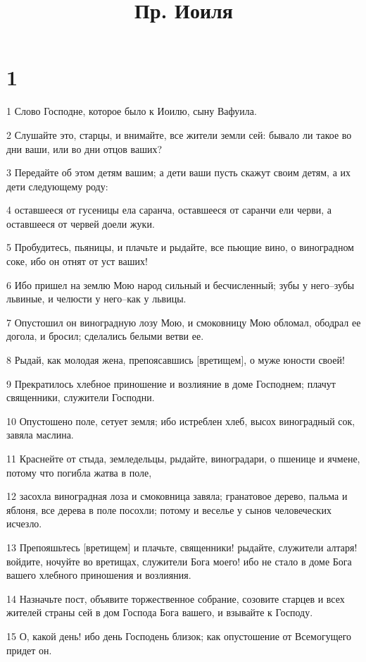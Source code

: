

\title{Пр. Иоиля}


\chapter{1}

\par 1 Слово Господне, которое было к Иоилю, сыну Вафуила.
\par 2 Слушайте это, старцы, и внимайте, все жители земли сей: бывало ли такое во дни ваши, или во дни отцов ваших?
\par 3 Передайте об этом детям вашим; а дети ваши пусть скажут своим детям, а их дети следующему роду:
\par 4 оставшееся от гусеницы ела саранча, оставшееся от саранчи ели черви, а оставшееся от червей доели жуки.
\par 5 Пробудитесь, пьяницы, и плачьте и рыдайте, все пьющие вино, о виноградном соке, ибо он отнят от уст ваших!
\par 6 Ибо пришел на землю Мою народ сильный и бесчисленный; зубы у него--зубы львиные, и челюсти у него--как у львицы.
\par 7 Опустошил он виноградную лозу Мою, и смоковницу Мою обломал, ободрал ее догола, и бросил; сделались белыми ветви ее.
\par 8 Рыдай, как молодая жена, препоясавшись [вретищем], о муже юности своей!
\par 9 Прекратилось хлебное приношение и возлияние в доме Господнем; плачут священники, служители Господни.
\par 10 Опустошено поле, сетует земля; ибо истреблен хлеб, высох виноградный сок, завяла маслина.
\par 11 Краснейте от стыда, земледельцы, рыдайте, виноградари, о пшенице и ячмене, потому что погибла жатва в поле,
\par 12 засохла виноградная лоза и смоковница завяла; гранатовое дерево, пальма и яблоня, все дерева в поле посохли; потому и веселье у сынов человеческих исчезло.
\par 13 Препояшьтесь [вретищем] и плачьте, священники! рыдайте, служители алтаря! войдите, ночуйте во вретищах, служители Бога моего! ибо не стало в доме Бога вашего хлебного приношения и возлияния.
\par 14 Назначьте пост, объявите торжественное собрание, созовите старцев и всех жителей страны сей в дом Господа Бога вашего, и взывайте к Господу.
\par 15 О, какой день! ибо день Господень близок; как опустошение от Всемогущего придет он.
